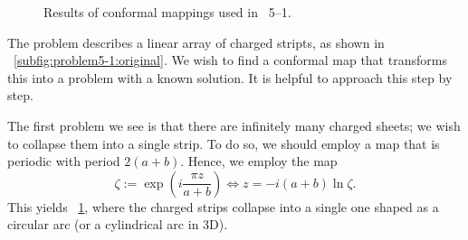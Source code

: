 \begin{figure}[ht]
\begin{subfigure}{0.4\textwidth}
\begin{tikzpicture}
        \end{tikzpicture}
        \caption{}%
        \label{subfig:problem5-1:exp}
    \end{subfigure}
    \hfill
    \begin{subfigure}{0.4\textwidth}
        \centering
        \caption{}%
        \label{subfig:problem5-1:final}
    \end{subfigure}
    \caption{Results of conformal mappings used in ~5--1.}%
    \label{fig:problem5-1}
\end{figure}

The problem describes a linear array of charged stripts,
as shown in ~\ref{subfig:problem5-1:original}.
We wish to find a conformal map that transforms this into a problem with a known solution.
It is helpful to approach this step by step.

The first problem we see is that there are infinitely many charged sheets;
we wish to collapse them into a single strip.
To do so, we should employ a map that is periodic with period $2(a+b)$.
Hence, we employ the map
\[
    \zeta := \exp\left( i\frac{\pi z}{a + b} \right)
    \Leftrightarrow z = -i (a + b) \ln\zeta.
\]
This yields ~\ref{subfig:problem5-1:exp}, where the charged strips collapse into
a single one shaped as a circular arc (or a cylindrical arc in 3D).

